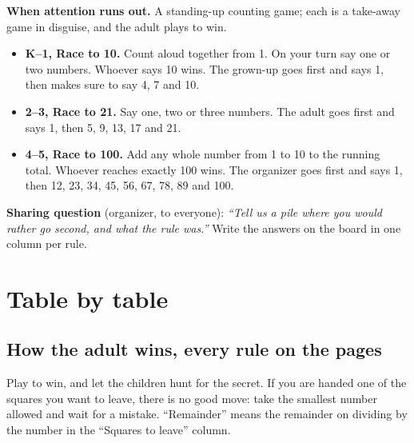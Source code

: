 \documentclass[10pt]{article}
\begin{document}
\textbf{When attention runs out.} A standing-up counting game; each is a
take-away game in disguise, and the adult plays to win.
\begin{itemize}
\item \textbf{K--1, Race to 10.} Count aloud together from 1. On your turn
say one or two numbers. Whoever says 10 wins. The grown-up goes first and says
1, then makes sure to say 4, 7 and 10.
\item \textbf{2--3, Race to 21.} Say one, two or three numbers. The adult goes
first and says 1, then 5, 9, 13, 17 and 21.
\item \textbf{4--5, Race to 100.} Add any whole number from 1 to 10 to the
running total. Whoever reaches exactly 100 wins. The organizer goes first and
says 1, then 12, 23, 34, 45, 56, 67, 78, 89 and 100.
\end{itemize}

\textbf{Sharing question} (organizer, to everyone): \textit{``Tell us a pile
where you would rather go second, and what the rule was.''} Write the answers on
the board in one column per rule.

\section{Table by table}

\subsection*{How the adult wins, every rule on the pages}

Play to win, and let the children hunt for the secret. If you are handed one
of the squares you want to leave, there is no good move: take the smallest
number allowed and wait for a mistake. ``Remainder'' means the remainder on
dividing by the number in the ``Squares to leave'' column.
\end{document}
